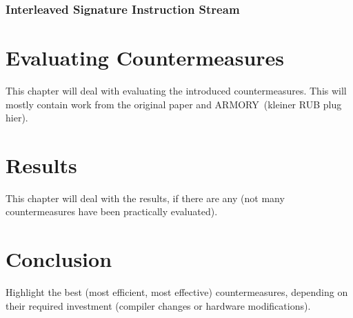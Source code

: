 \subsection{Interleaved Signature Instruction Stream}

\chapter{Evaluating Countermeasures}
This chapter will deal with evaluating the introduced countermeasures. This will mostly contain work from the original paper and ARMORY\,\cite{9206547} (kleiner RUB plug hier).


\chapter{Results}
This chapter will deal with the results, if there are any (not many countermeasures have been practically evaluated). 

\chapter{Conclusion}
Highlight the best (most efficient, most effective) countermeasures, depending on their required investment (compiler changes or hardware modifications).
